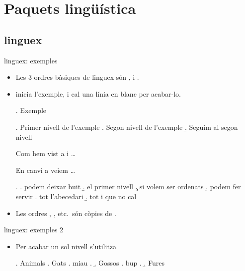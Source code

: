 \section{Paquets lingüística}
\subsection{linguex}
\begin{frame}[fragile]{linguex: exemples}
\begin{itemize}
\item Les 3 ordres bàsiques de linguex són ,  i .
\item {} inicia l'exemple, i cal una línia en blanc per acabar-lo.
\begin{exampletwouptiny2}
\ex. Exemple

\ex. Primer nivell de l'exemple
\a. Segon nivell de l'exemple
\b. Seguim al segon nivell

Com hem vist a \LLast i \Last \dots

En canvi a \Next veiem \dots

\ex.
\a. podem deixar buit
\b. el primer nivell
\c. si volem ser ordenats
\d. podem fer servir
\e. tot l'abecedari
\b. tot i que no cal

\end{exampletwouptiny2}
\item Les ordres , , etc.~són còpies de .
\end{itemize}
\end{frame}

\begin{frame}[fragile]{linguex: exemples 2}
\begin{itemize}
\item Per acabar un sol nivell s'utilitza 
\begin{exampletwouptiny2}
\ex. Animals
\a. Gats
\a. miau
\z.
\b. Gossos
\a. bup
\z.
\b. Fures

\end{exampletwouptiny2}
\end{itemize}

\end{frame}

